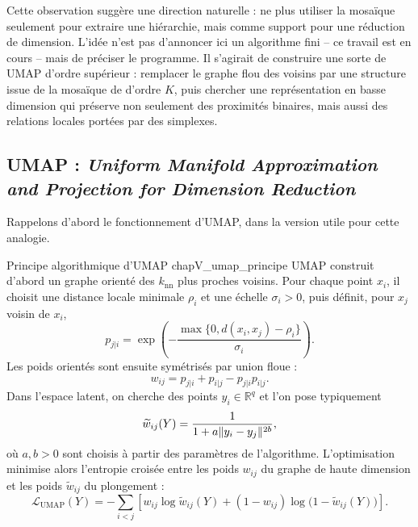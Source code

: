 
Cette observation suggère une direction naturelle : ne plus utiliser la mosaïque seulement pour extraire une hiérarchie, mais comme support pour une réduction de dimension. L'idée n'est pas d'annoncer ici un algorithme fini -- ce travail est en cours -- mais de préciser le programme. Il s'agirait de construire une sorte de UMAP d'ordre supérieur : remplacer le graphe flou des voisins par une structure issue de la mosaïque de  d'ordre $K$, puis chercher une représentation en basse dimension qui préserve non seulement des proximités binaires, mais aussi des relations locales portées par des simplexes.

\subsection{UMAP : \emph{Uniform Manifold Approximation and Projection for Dimension Reduction}}

Rappelons d'abord le fonctionnement d'UMAP, dans la version utile pour cette analogie.

\begin{Resultat}{Principe algorithmique d'UMAP \cite{Umap}}{chapV_umap_principe}
UMAP construit d'abord un graphe orienté des $k_\mathrm{nn}$ plus proches voisins. Pour chaque point $x_i$, il choisit une distance locale minimale $\rho_i$ et une échelle $\sigma_i>0$, puis définit, pour $x_j$ voisin de $x_i$,
\[
    p_{j|i}
    =
    \exp\left(-\frac{\max\{0,d(x_i,x_j)-\rho_i\}}{\sigma_i}\right).
\]
Les poids orientés sont ensuite symétrisés par union floue :
\[
    w_{ij}=p_{j|i}+p_{i|j}-p_{j|i}p_{i|j}.
\]
Dans l'espace latent, on cherche des points $y_i\in\mathbb R^q$ et l'on pose typiquement
\[
    \widetilde w_{ij}(Y)
    =
    \frac{1}{1+a\lVert y_i-y_j \rVert^{2b}},
\]
où $a,b>0$ sont choisis à partir des paramètres de l'algorithme. L'optimisation minimise alors l'entropie croisée entre les poids $w_{ij}$ du graphe de haute dimension et les poids $\widetilde w_{ij}$ du plongement :
\[
\boxed{
    \mathcal L_\mathrm{UMAP}(Y)
    =
    -\sum_{i<j}
    \left[
        w_{ij}\log \widetilde w_{ij}(Y)
        +(1-w_{ij})\log\bigl(1-\widetilde w_{ij}(Y)\bigr)
    \right].}
\]
\end{Resultat}

